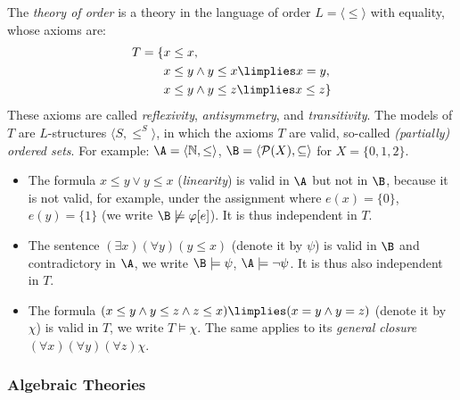 The \emph{theory of order} is a theory in the language of order $L=\langle\leq\rangle$ with equality, whose axioms are:
\begin{align*}
    T=\{& x\leq x,\\
        & x\leq y\land y\leq x\limplies x=y,\\
        & x\leq y\land y\leq z\limplies x\leq z\}\\
\end{align*}
These axioms are called \emph{reflexivity}, \emph{antisymmetry}, and \emph{transitivity}. The models of $T$ are $L$-structures $\langle S,\leq^S\rangle$, in which the axioms $T$ are valid, so-called \emph{(partially) ordered sets}. For example: $\A=\langle\mathbb N,\leq\rangle$, $\B=\langle\mathcal P(X),\subseteq\rangle$ for $X=\{0,1,2\}$.
\begin{itemize}
    \item The formula $x\leq y\lor y\leq x$ (\emph{linearity}) is valid in $\A$ but not in $\B$, because it is not valid, for example, under the assignment where $e(x)=\{0\}$, $e(y)=\{1\}$ (we write $\B\not\models\varphi[e]$). It is thus independent in $T$.
    \item The sentence $(\exists x)(\forall y)(y\leq x)$ (denote it by $\psi$) is valid in $\B$ and contradictory in $\A$, we write $\B\models\psi$, $\A\models\neg\psi$. It is thus also independent in $T$.
    \item The formula $(x\leq y\land y\leq z\land z\leq x)\limplies (x=y\land y=z)$ (denote it by $\chi$) is valid in $T$, we write $T\models\chi$. The same applies to its \emph{general closure} $(\forall x)(\forall y)(\forall z)\chi$.
\end{itemize}

\subsubsection{Algebraic Theories}

